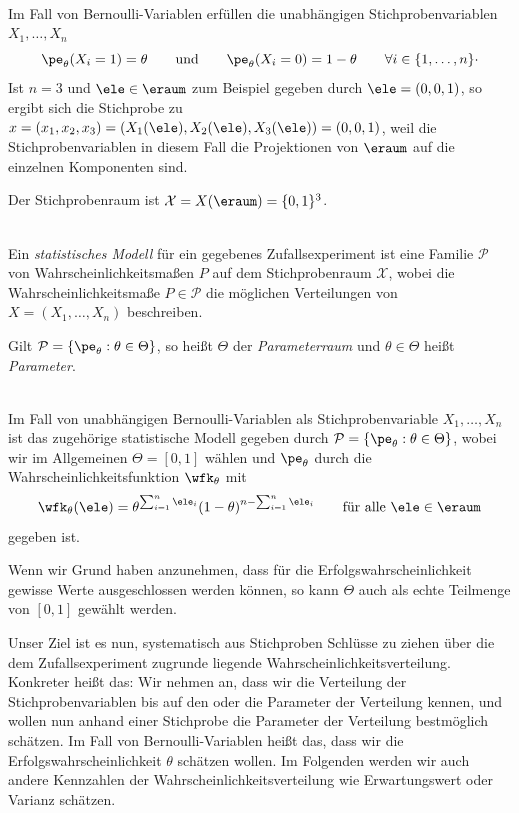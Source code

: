 \begin{bsp} \\
    Im Fall von \gls{Bernoulli-Variable}n erfüllen die unabhängigen \gls{Stichprobenvariable}n $X_1,\dots,X_n$
    \[
        \pe_{\theta}(X_i=1)=\theta \qquad\text{und}\qquad \pe_{\theta}(X_i=0)=1-\theta \qquad \forall i\in\{1,\dots,n\} \cdot
    \]
    Ist $n=3$ und $\ele\in\eraum$ zum Beispiel gegeben durch $\ele=(0,0,1)$, so ergibt sich die Stichprobe zu $x=(x_1,x_2,x_3)=(X_1(\ele),X_2(\ele),X_3(\ele))=(0,0,1)$, weil die \gls{Stichprobenvariable}n in diesem Fall die Projektionen von $\eraum$ auf die einzelnen Komponenten sind.

    Der \gls{Stichprobenraum} ist $\mathcal X = X(\eraum) = \{0,1\}^3$.
\end{bsp}

\begin{defi}  \\
    Ein \emph{statistisches Modell} für ein gegebenes Zufallsexperiment ist eine Familie $\mathcal P$ von Wahrscheinlichkeitsmaßen $P$ auf dem \gls{Stichprobenraum} $\mathcal X$, wobei die Wahrscheinlichkeitsmaße $P\in\mathcal P$ die möglichen Verteilungen von $X=(X_1,\dots,X_n)$ beschreiben.

    Gilt $\mathcal P = \{\pe_{\theta} : \theta\in\Theta\}$, so heißt $\Theta$ der \emph{Parameterraum} und $\theta\in\Theta$ heißt \emph{Parameter}.
\end{defi}

\begin{bsp}  \\
    Im Fall von unabhängigen \gls{Bernoulli-Variable}n als \gls{Stichprobenvariable} $X_1,\dots,X_n$ ist das zugehörige statistische Modell gegeben durch $\mathcal P = \{\pe_{\theta}:\theta\in\Theta\}$, wobei wir im Allgemeinen $\Theta=[0,1]$ wählen und $\pe_{\theta}$ durch die Wahrscheinlichkeitsfunktion $\wfk_\theta$ mit
    \[
        \wfk_\theta(\ele) = \theta^{\sum_{i=1}^n\ele_i}(1-\theta)^{n-\sum_{i=1}^n\ele_i} \qquad \text{für alle } \ele\in\eraum
    \]
    gegeben ist.

    Wenn wir Grund haben anzunehmen, dass für die Erfolgswahrscheinlichkeit gewisse Werte ausgeschlossen werden können, so kann $\Theta$ auch als echte Teilmenge von $[0,1]$ gewählt werden.
\end{bsp}

Unser Ziel ist es nun, systematisch aus Stichproben Schlüsse zu ziehen über die dem Zufallsexperiment zugrunde liegende Wahrscheinlichkeitsverteilung.
Konkreter heißt das: Wir nehmen an, dass wir die Verteilung der \gls{Stichprobenvariable}n bis auf den oder die
Parameter der Verteilung kennen, und wollen nun anhand einer Stichprobe die Parameter der Verteilung bestmöglich schätzen.
Im Fall von \gls{Bernoulli-Variable}n heißt das, dass wir die Erfolgswahrscheinlichkeit $\theta$ schätzen wollen.
Im Folgenden werden wir auch andere Kennzahlen der Wahrscheinlichkeitsverteilung wie Erwartungswert oder Varianz schätzen.

